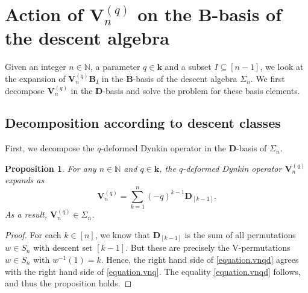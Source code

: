 \documentclass[revision]{FPSAC2025}
\newtheorem{proposition}{Proposition}
\newcommand{\w}{\omega}
\newcommand{\NN}{\mathbb{N}} %
\newcommand{\kk}{\mathbf{k}} %
\begin{document}
\section{Action of $\mathbf{V}_n^{(q)}$ on the $\mathbf{B}$-basis of the descent algebra}

Given an integer $n \in \NN$, a parameter $q \in \kk$ and a subset $I \subseteq [n-1]$, we look at the expansion of $\mathbf{V}_n^{(q)} \mathbf{B}_I$ in the $\mathbf{B}$-basis of the descent algebra $\Sigma_n$. We first decompose $\mathbf{V}_n^{(q)}$  in the $\mathbf{D}$-basis and solve the problem for these basis elements.
\subsection{Decomposition according to descent classes}
% 
First, we decompose the $q$-deformed Dynkin operator in the $\mathbf{D}$-basis of $\Sigma_n$.
\begin{proposition}
\label{proposition.vnqd}
For any $n \in \NN$ and $q \in \kk$, the $q$-deformed Dynkin operator $\mathbf{V}_{n}^{(q)}$ expands as
\begin{equation}
\label{equation.vnqd}
\mathbf{V}_{n}^{(q)} = \sum_{k=1}^n (-q)^{k-1} \mathbf{D}_{[k-1]}.
\end{equation}
As a result, $\mathbf{V}_{n}^{(q)} \in \Sigma_n$.
\end{proposition}
\begin{proof}
For each $k \in [n]$, we know that $\mathbf{D}_{\left[  k-1\right]  }$ is the sum of all permutations $w \in S_n$ with descent set $[k-1]$. But these are precisely the V-permutations $w \in S_n$ with $w^{-1}\left(1\right) = k$.
Hence, the right hand side of \eqref{equation.vnqd} agrees with the right hand side of \eqref{equation.vnq}.
The equality \eqref{equation.vnqd} follows, and thus the proposition holds.
\end{proof}
\end{document}
